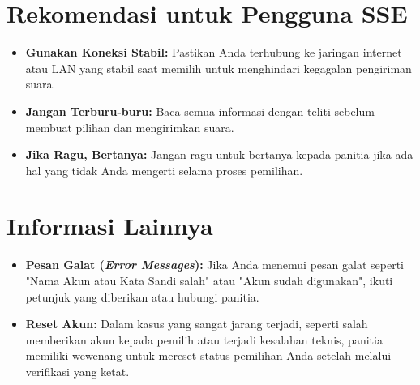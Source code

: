 \section{Rekomendasi untuk Pengguna SSE}
\label{sec:rekomendasi_sse}
\begin{itemize}
	\item \textbf{Gunakan Koneksi Stabil:} Pastikan Anda terhubung ke jaringan internet atau LAN yang stabil saat memilih untuk menghindari kegagalan pengiriman suara.
	\item \textbf{Jangan Terburu-buru:} Baca semua informasi dengan teliti sebelum membuat pilihan dan mengirimkan suara.
	\item \textbf{Jika Ragu, Bertanya:} Jangan ragu untuk bertanya kepada panitia jika ada hal yang tidak Anda mengerti selama proses pemilihan.
\end{itemize}

\section{Informasi Lainnya}
\label{sec:info_lainnya_sse}
\begin{itemize}
	\item \textbf{Pesan Galat (\textit{Error Messages}):} Jika Anda menemui pesan galat seperti "Nama Akun atau Kata Sandi salah" atau "Akun sudah digunakan", ikuti petunjuk yang diberikan atau hubungi panitia.
	\item \textbf{Reset Akun:} Dalam kasus yang sangat jarang terjadi, seperti salah memberikan akun kepada pemilih atau terjadi kesalahan teknis, panitia memiliki wewenang untuk mereset status pemilihan Anda setelah melalui verifikasi yang ketat.
\end{itemize}



